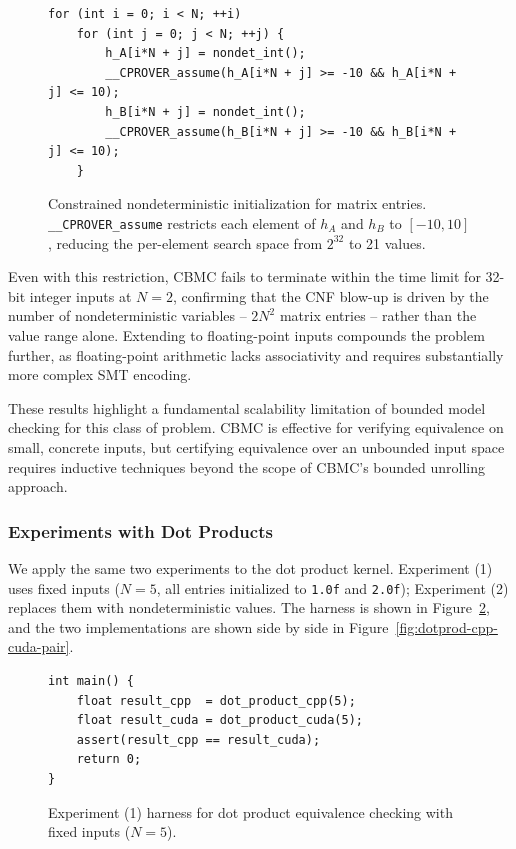 \documentclass{article}
\begin{document}
\begin{figure}[H]
\begin{verbatim}
for (int i = 0; i < N; ++i)
    for (int j = 0; j < N; ++j) {
        h_A[i*N + j] = nondet_int();
        __CPROVER_assume(h_A[i*N + j] >= -10 && h_A[i*N + j] <= 10);
        h_B[i*N + j] = nondet_int();
        __CPROVER_assume(h_B[i*N + j] >= -10 && h_B[i*N + j] <= 10);
    }
\end{verbatim}
\caption{Constrained nondeterministic initialization for matrix entries. \texttt{\_\_CPROVER\_assume} restricts each element of $h_A$ and $h_B$ to $[-10, 10]$, reducing the per-element search space from $2^{32}$ to 21 values.}
\label{fig:matmul-constrained-init}
\end{figure}

Even with this restriction, CBMC fails to terminate within the time limit for 32-bit integer inputs at $N = 2$, confirming that the CNF blow-up is driven by the number of nondeterministic variables -- $2N^2$ matrix entries -- rather than the value range alone. Extending to floating-point inputs compounds the problem further, as floating-point arithmetic lacks associativity and requires substantially more complex SMT encoding.

These results highlight a fundamental scalability limitation of bounded model checking for this class of problem. CBMC is effective for verifying equivalence on small, concrete inputs, but certifying equivalence over an unbounded input space requires inductive techniques beyond the scope of CBMC's bounded unrolling approach.

\subsubsection{Experiments with Dot Products}

We apply the same two experiments to the dot product kernel. Experiment (1) uses fixed inputs ($N = 5$, all entries initialized to \texttt{1.0f} and \texttt{2.0f}); Experiment (2) replaces them with nondeterministic values. The harness is shown in Figure~\ref{fig:dotprod-cbmc-fixed}, and the two implementations are shown side by side in Figure~\ref{fig:dotprod-cpp-cuda-pair}.

\begin{figure}[H]
\begin{verbatim}
int main() {
    float result_cpp  = dot_product_cpp(5);
    float result_cuda = dot_product_cuda(5);
    assert(result_cpp == result_cuda);
    return 0;
}
\end{verbatim}
\caption{Experiment (1) harness for dot product equivalence checking with fixed inputs ($N = 5$).}
\label{fig:dotprod-cbmc-fixed}
\end{figure}
\end{document}
